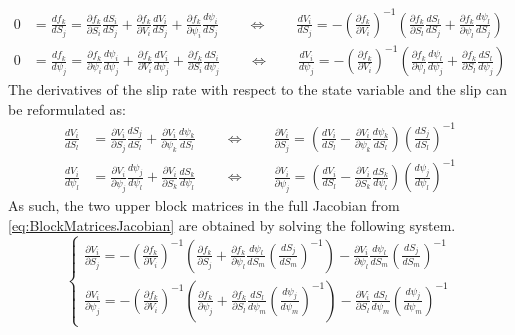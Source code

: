\documentclass{report}
\begin{document}
\begin{align}
    0 &= \frac{df_k}{dS_j} =     
	\frac{\partial f_k}{\partial S_i}\frac{d S_i}{d S_j} + 
	\frac{\partial f_k}{\partial V_i}\frac{d V_i}{d S_j} + 
	\frac{\partial f_k}{\partial \psi_i}\frac{d \psi_i}{d S_j} 
	\qquad\Leftrightarrow\qquad
	\frac{d V_i}{d S_j} = -\left(\frac{\partial f_k}{\partial V_i}\right)^{-1}\left(\frac{\partial f_k}{\partial S_l}\frac{d S_l}{d S_j} + \frac{\partial f_k}{\partial \psi_l}\frac{d \psi_l}{d S_j} \right) 
	\label{eq:SEASDAE_partialdV_dS} \\
    0 &= \frac{df_k}{d\psi_j} = 
    \frac{\partial f_k}{\partial \psi_i}\frac{d \psi_i}{d \psi_j} + 
    \frac{\partial f_k}{\partial V_i}\frac{d V_i}{d \psi_j} + 
    \frac{\partial f_k}{\partial S_i}\frac{d S_i}{d \psi_j}
    \qquad\Leftrightarrow\qquad
    \frac{d V_i}{d \psi_j} = -\left(\frac{\partial f_k}{\partial V_i}\right)^{-1}\left(\frac{\partial f_k}{\partial \psi_l}\frac{d \psi_l}{d \psi_j}  + 
    \frac{\partial f_k}{\partial S_l} \frac{d S_l}{d \psi_j}\right)
    \label{eq:SEASDAE_partialdV_dpsi}
\end{align}
The derivatives of the slip rate with respect to the state variable and the slip can be reformulated as: 
\begin{align}
	\frac{dV_i}{dS_l} &= \frac{\partial V_i}{\partial S_j}\frac{d S_j}{d S_l} + \frac{\partial V_i}{\partial \psi_k}\frac{d\psi_k}{dS_l} 
	\qquad\Leftrightarrow\qquad
	\frac{\partial V_i}{\partial S_j} = \left(\frac{dV_i}{dS_l} - \frac{\partial V_i}{\partial \psi_k} \frac{d\psi_k}{dS_l}\right)\left(\frac{d S_j}{d S_l}\right)^{-1} \\
	\frac{dV_i}{d\psi_l} &= \frac{\partial V_i}{\partial \psi_j}\frac{d \psi_j}{d \psi_l} +  \frac{\partial V_i}{\partial S_k}\frac{dS_k}{d\psi_l} 
	\qquad\Leftrightarrow\qquad
	\frac{\partial V_i}{\partial \psi_j} = \left(\frac{dV_i}{dS_l} - \frac{\partial V_i}{\partial S_k}\frac{dS_k}{d\psi_l} \right)\left(\frac{d \psi_j}{d \psi_l}\right)^{-1}	
\end{align}
As such, the two upper block matrices in the full Jacobian from \autoref{eq:BlockMatricesJacobian} are obtained by solving the following system. 
\begin{equation}
\label{eq:systemJacobianSlipRate}
\begin{cases}
	\frac{\partial V_i}{\partial S_j} = -\left(\frac{\partial f_k}{\partial V_i}\right)^{-1}\left(\frac{\partial f_k}{\partial S_j} + \frac{\partial f_k}{\partial \psi_l}\frac{d \psi_l}{d S_m}\left(\frac{d S_j}{d S_m}\right)^{-1} \right) 
	-\frac{\partial V_i}{\partial \psi_l} \frac{d\psi_l}{dS_m} \left(\frac{d S_j}{d S_m}\right)^{-1} \\
	\frac{\partial V_i}{\partial \psi_j} = -\left(\frac{\partial f_k}{\partial V_i}\right)^{-1}\left(\frac{\partial f_k}{\partial \psi_j} + 
	\frac{\partial f_k}{\partial S_l}\frac{d S_l}{d \psi_m}\left(\frac{d \psi_j}{d \psi_m}\right)^{-1} \right) 
	-\frac{\partial V_i}{\partial S_l}\frac{dS_l}{d\psi_m}\left(\frac{d \psi_j}{d \psi_m}\right)^{-1}
\end{cases}
\end{equation}
\end{document}
